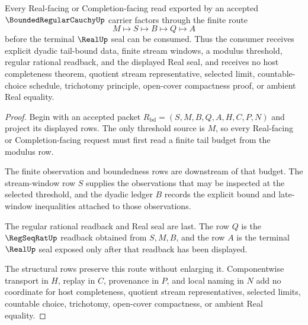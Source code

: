 \begin{theorem}
\label{thm:bounded-regular-cauchy-real-seal-boundary}
Every Real-facing or Completion-facing read exported by an accepted $\BoundedRegularCauchyUp$ carrier factors through the finite route
$$
M\longmapsto S\longmapsto B\longmapsto Q\longmapsto A
$$
before the terminal $\RealUp$ seal can be consumed. Thus the consumer receives explicit dyadic tail-bound data, finite stream windows, a modulus threshold, regular rational readback, and the displayed Real seal, and receives no host completeness theorem, quotient stream representative, selected limit, countable-choice schedule, trichotomy principle, open-cover compactness proof, or ambient Real equality.
\end{theorem}
\begin{proof}
Begin with an accepted packet $R_{\mathrm{bd}}=(S,M,B,Q,A,H,C,P,N)$ and project its displayed rows. The only threshold source is $M$, so every Real-facing or Completion-facing request must first read a finite tail budget from the modulus row.

The finite observation and boundedness rows are downstream of that budget. The stream-window row $S$ supplies the observations that may be inspected at the selected threshold, and the dyadic ledger $B$ records the explicit bound and late-window inequalities attached to those observations.

The regular rational readback and Real seal are last. The row $Q$ is the $\RegSeqRatUp$ readback obtained from $S,M,B$, and the row $A$ is the terminal $\RealUp$ seal exposed only after that readback has been displayed.

The structural rows preserve this route without enlarging it. Componentwise transport in $H$, replay in $C$, provenance in $P$, and local naming in $N$ add no coordinate for host completeness, quotient stream representatives, selected limits, countable choice, trichotomy, open-cover compactness, or ambient Real equality.
\end{proof}

